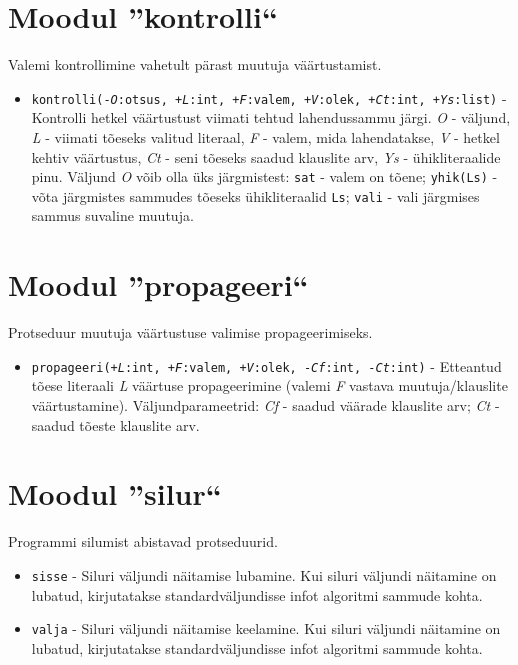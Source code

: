 \section{Moodul ''kontrolli``}

Valemi kontrollimine vahetult pärast muutuja väärtustamist.

\begin{itemize}
\item {\tt kontrolli(-{\it O}:otsus, +{\it L}:int, +{\it F}:valem, +{\it V}:olek, +{\it Ct}:int, +{\it Ys}:list)} - Kontrolli hetkel väärtustust viimati tehtud
lahendussammu järgi. {\it O} - väljund, {\it L} - viimati tõeseks
valitud literaal, {\it F} - valem, mida lahendatakse, {\it V} - hetkel
kehtiv väärtustus, {\it Ct} - seni tõeseks saadud klauslite arv,
{\it Ys} - ühikliteraalide pinu.
Väljund {\it O} võib olla üks järgmistest: \texttt{sat} - valem on tõene;
\texttt{yhik(Ls)} - võta järgmistes sammudes tõeseks ühikliteraalid \texttt{Ls};
\texttt{vali} - vali järgmises sammus suvaline muutuja.

\end{itemize}

\section{Moodul ''propageeri``}

Protseduur muutuja väärtustuse valimise propageerimiseks.

\begin{itemize}
\item {\tt propageeri(+{\it L}:int, +{\it F}:valem, +{\it V}:olek, -{\it Cf}:int, -{\it Ct}:int)} - Etteantud tõese literaali {\it L} väärtuse propageerimine
(valemi {\it F} vastava muutuja/klauslite väärtustamine).
Väljundparameetrid: {\it Cf} - saadud väärade klauslite arv;
{\it Ct} - saadud tõeste klauslite arv.

\end{itemize}

\section{Moodul ''silur``}

Programmi silumist abistavad protseduurid.

\begin{itemize}
\item {\tt sisse} - Siluri väljundi näitamise lubamine. Kui siluri väljundi näitamine
on lubatud, kirjutatakse standardväljundisse infot algoritmi sammude
kohta.

\item {\tt valja} - Siluri väljundi näitamise keelamine. Kui siluri väljundi näitamine
on lubatud, kirjutatakse standardväljundisse infot algoritmi sammude
kohta.

\end{itemize}

